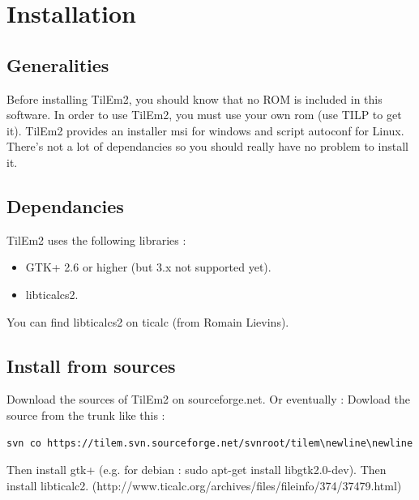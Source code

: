 \documentclass[10pt]{report}
\begin{document}
\chapter{Installation}
\section{Generalities}
Before installing TilEm2, you should know that no ROM is included in this software.\newline
In order to use TilEm2, you must use your own rom (use TILP to get it).\newline
TilEm2 provides an installer msi for windows and script autoconf for Linux.\newline
There's not a lot of dependancies so you should really have no problem to install it.\newline

\section{Dependancies}
TilEm2 uses the following libraries :\newline
\begin{itemize}
\item	GTK+ 2.6 or higher (but 3.x not supported yet).
\item	libticalcs2.
\end{itemize}
You can find libticalcs2 on ticalc (from Romain Lievins).\newline

\section{Install from sources}
Download the sources of TilEm2 on sourceforge.net.\newline
Or eventually :\newline
Dowload the source from the trunk like this :\newline
\begin{lstlisting}
svn co https://tilem.svn.sourceforge.net/svnroot/tilem\newline\newline
\end{lstlisting}

Then install gtk+ (e.g. for debian : sudo apt-get install libgtk2.0-dev).\newline
Then install libticalc2.\newline\newline
(http://www.ticalc.org/archives/files/fileinfo/374/37479.html)\newline\newline
\end{document}
